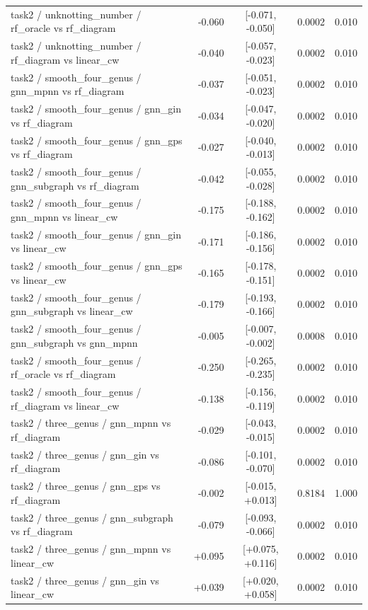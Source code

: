 \begin{longtable}{p{8.2cm} r c r r}
task2 / unknotting\_number / rf\_oracle vs rf\_diagram & -0.060 & [-0.071, -0.050] & 0.0002 & 0.010\\
task2 / unknotting\_number / rf\_diagram vs linear\_cw & -0.040 & [-0.057, -0.023] & 0.0002 & 0.010\\
task2 / smooth\_four\_genus / gnn\_mpnn vs rf\_diagram & -0.037 & [-0.051, -0.023] & 0.0002 & 0.010\\
task2 / smooth\_four\_genus / gnn\_gin vs rf\_diagram & -0.034 & [-0.047, -0.020] & 0.0002 & 0.010\\
task2 / smooth\_four\_genus / gnn\_gps vs rf\_diagram & -0.027 & [-0.040, -0.013] & 0.0002 & 0.010\\
task2 / smooth\_four\_genus / gnn\_subgraph vs rf\_diagram & -0.042 & [-0.055, -0.028] & 0.0002 & 0.010\\
task2 / smooth\_four\_genus / gnn\_mpnn vs linear\_cw & -0.175 & [-0.188, -0.162] & 0.0002 & 0.010\\
task2 / smooth\_four\_genus / gnn\_gin vs linear\_cw & -0.171 & [-0.186, -0.156] & 0.0002 & 0.010\\
task2 / smooth\_four\_genus / gnn\_gps vs linear\_cw & -0.165 & [-0.178, -0.151] & 0.0002 & 0.010\\
task2 / smooth\_four\_genus / gnn\_subgraph vs linear\_cw & -0.179 & [-0.193, -0.166] & 0.0002 & 0.010\\
task2 / smooth\_four\_genus / gnn\_subgraph vs gnn\_mpnn & -0.005 & [-0.007, -0.002] & 0.0008 & 0.010\\
task2 / smooth\_four\_genus / rf\_oracle vs rf\_diagram & -0.250 & [-0.265, -0.235] & 0.0002 & 0.010\\
task2 / smooth\_four\_genus / rf\_diagram vs linear\_cw & -0.138 & [-0.156, -0.119] & 0.0002 & 0.010\\
task2 / three\_genus / gnn\_mpnn vs rf\_diagram & -0.029 & [-0.043, -0.015] & 0.0002 & 0.010\\
task2 / three\_genus / gnn\_gin vs rf\_diagram & -0.086 & [-0.101, -0.070] & 0.0002 & 0.010\\
task2 / three\_genus / gnn\_gps vs rf\_diagram & -0.002 & [-0.015, +0.013] & 0.8184 & 1.000\\
task2 / three\_genus / gnn\_subgraph vs rf\_diagram & -0.079 & [-0.093, -0.066] & 0.0002 & 0.010\\
task2 / three\_genus / gnn\_mpnn vs linear\_cw & +0.095 & [+0.075, +0.116] & 0.0002 & 0.010\\
task2 / three\_genus / gnn\_gin vs linear\_cw & +0.039 & [+0.020, +0.058] & 0.0002 & 0.010\\

\end{longtable}
